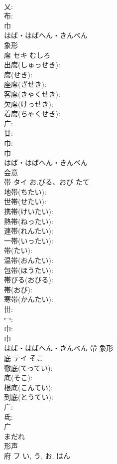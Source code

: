 \documentclass[8pt]{extreport}
\begin{document}
\begin{CJK}{UTF8}{min}
\\	乂: 
\\	布: 
\\	巾	
\\	はば・はばへん・きんべん	
\\	象形 
\\	席	セキ	むしろ		
\\	出席(しゅっせき): 
\\	席(せき): 
\\	座席(ざせき): 
\\	客席(きゃくせき): 
\\	欠席(けっせき): 
\\	着席(ちゃくせき): 
\\	广: 
\\	廿: 
\\	巾: 
\\	巾	
\\	はば・はばへん・きんべん	
\\	会意 
\\	帯	タイ	お.びる、おび	たて	
\\	地帯(ちたい): 
\\	世帯(せたい): 
\\	携帯(けいたい): 
\\	熱帯(ねったい): 
\\	連帯(れんたい): 
\\	一帯(いったい): 
\\	帯(たい): 
\\	温帯(おんたい): 
\\	包帯(ほうたい): 
\\	帯びる(おびる): 
\\	帯(おび): 
\\	寒帯(かんたい): 
\\	丗: 
\\	冖: 
\\	巾: 
\\	巾	
\\	はば・はばへん・きんべん	帶	象形 
\\	底	テイ	そこ		
\\	徹底(てってい): 
\\	底(そこ): 
\\	根底(こんてい): 
\\	到底(とうてい): 
\\	广: 
\\	氐: 
\\	广	
\\	まだれ	
\\	形声 
\\	府	フ		い, う, お, はん	

\end{CJK}
\end{document}
